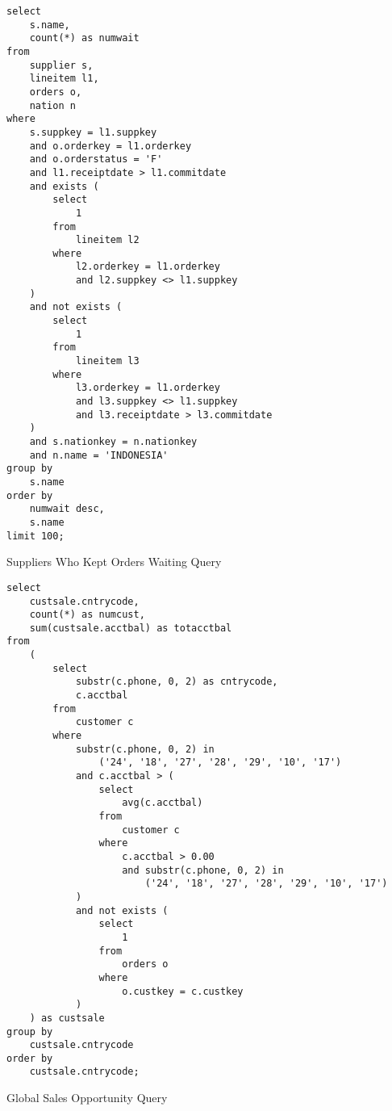 \begin{listing}[!ht]
\begin{verbatim}
select
    s.name,
    count(*) as numwait
from
    supplier s,
    lineitem l1,
    orders o,
    nation n
where
    s.suppkey = l1.suppkey
    and o.orderkey = l1.orderkey
    and o.orderstatus = 'F'
    and l1.receiptdate > l1.commitdate
    and exists (
        select
            1
        from
            lineitem l2
        where
            l2.orderkey = l1.orderkey
            and l2.suppkey <> l1.suppkey
    )
    and not exists (
        select
            1
        from
            lineitem l3
        where
            l3.orderkey = l1.orderkey
            and l3.suppkey <> l1.suppkey
            and l3.receiptdate > l3.commitdate
    )
    and s.nationkey = n.nationkey
    and n.name = 'INDONESIA'
group by
    s.name
order by
    numwait desc,
    s.name
limit 100;
\end{verbatim}
\caption{Suppliers Who Kept Orders Waiting Query}
\end{listing}

\begin{listing}[!ht]
\begin{verbatim}
select
    custsale.cntrycode,
    count(*) as numcust,
    sum(custsale.acctbal) as totacctbal
from
    (
        select
            substr(c.phone, 0, 2) as cntrycode,
            c.acctbal
        from
            customer c
        where
            substr(c.phone, 0, 2) in
                ('24', '18', '27', '28', '29', '10', '17')
            and c.acctbal > (
                select
                    avg(c.acctbal)
                from
                    customer c
                where
                    c.acctbal > 0.00
                    and substr(c.phone, 0, 2) in
                        ('24', '18', '27', '28', '29', '10', '17')
            )
            and not exists (
                select
                    1
                from
                    orders o
                where
                    o.custkey = c.custkey
            )
    ) as custsale
group by
    custsale.cntrycode
order by
    custsale.cntrycode;
\end{verbatim}
\caption{Global Sales Opportunity Query}
\end{listing}
